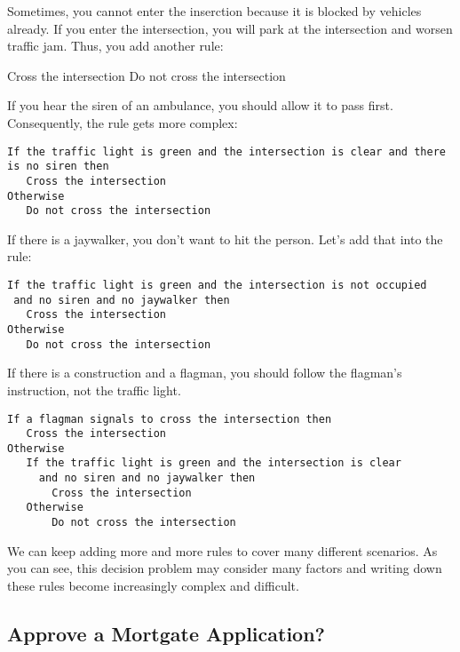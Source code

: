 Sometimes, you cannot enter the inserction because it is blocked
by vehicles already. If you enter the intersection, you will park
at the intersection and worsen traffic jam. Thus, you add another rule:

\begin{algorithm}
    \begin{algorithmic}[1]
      \State Cross the intersection
      \Else
      \State Do not cross the intersection
      \EndIf
    \end{algorithmic}
\end{algorithm}

If you hear the siren of an ambulance, you should allow it to pass first.
Consequently, the rule gets more complex:

\begin{verbatim}
If the traffic light is green and the intersection is clear and there is no siren then
   Cross the intersection
Otherwise
   Do not cross the intersection
\end{verbatim}

If there is a jaywalker, you don't want to hit the person. Let's add that into the rule:

\begin{verbatim}
If the traffic light is green and the intersection is not occupied 
 and no siren and no jaywalker then
   Cross the intersection
Otherwise
   Do not cross the intersection
\end{verbatim}

If there is a construction and a flagman, you should follow the
flagman's instruction, not the traffic light.  

\begin{verbatim}
If a flagman signals to cross the intersection then
   Cross the intersection
Otherwise
   If the traffic light is green and the intersection is clear 
     and no siren and no jaywalker then
       Cross the intersection
   Otherwise
       Do not cross the intersection
\end{verbatim}

We can keep adding more and more rules to cover many different
scenarios.  As you can see, this decision problem may consider many
factors and writing down these rules become increasingly complex and
difficult.

\subsection{Approve a Mortgate Application?}

